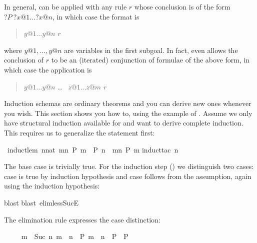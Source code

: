 \begin{isabellebody}
\begin{isamarkuptext}
In general,  can be applied with any rule $r$
whose conclusion is of the form ${?}P~?x@1 \dots ?x@n$, in which case the
format is
\begin{quote}
 $y@1 \dots y@n$  $r$\isa{{\isacharparenright}}
\end{quote}%
where $y@1, \dots, y@n$ are variables in the first subgoal.
In fact,  even allows the conclusion of
$r$ to be an (iterated) conjunction of formulae of the above form, in
which case the application is
\begin{quote}
 $y@1 \dots y@n$  \dots\  $z@1 \dots z@m$  $r$\isa{{\isacharparenright}}
\end{quote}%
\end{isamarkuptext}%
%
%
\begin{isamarkuptext}%
\label{sec:derive-ind}
Induction schemas are ordinary theorems and you can derive new ones
whenever you wish.  This section shows you how to, using the example
of . Assume we only have structural induction
available for  and want to derive complete induction. This
requires us to generalize the statement first:%
\end{isamarkuptext}%
\ induct{\isacharunderscore}lem{\isacharcolon}\ {\isachardoublequote}{\isacharparenleft}{\isasymAnd}n{\isacharcolon}{\isacharcolon}nat{\isachardot}\ {\isasymforall}m{\isacharless}n{\isachardot}\ P\ m\ {\isasymLongrightarrow}\ P\ n{\isacharparenright}\ {\isasymLongrightarrow}\ {\isasymforall}m{\isacharless}n{\isachardot}\ P\ m{\isachardoublequote}\isanewline
{}induct{\isacharunderscore}tac\ n{\isacharparenright}%
\begin{isamarkuptxt}%
\noindent
The base case is trivially true. For the induction step () we distinguish two cases: case  is true by induction
hypothesis and case  follows from the assumption, again using
the induction hypothesis:%
\end{isamarkuptxt}%
blast{\isacharparenright}\isanewline
{}blast\ elim{\isacharcolon}less{\isacharunderscore}SucE{\isacharparenright}%
\begin{isamarkuptext}%
\noindent
The elimination rule  expresses the case distinction:
\begin{isabelle}%
\ \ \ \ \ {\isasymlbrakk}m\ {\isacharless}\ Suc\ n{\isacharsemicolon}\ m\ {\isacharless}\ n\ {\isasymLongrightarrow}\ P{\isacharsemicolon}\ m\ {\isacharequal}\ n\ {\isasymLongrightarrow}\ P{\isasymrbrakk}\ {\isasymLongrightarrow}\ P%
\end{isabelle}


\end{isamarkuptext}
\end{isabellebody}
